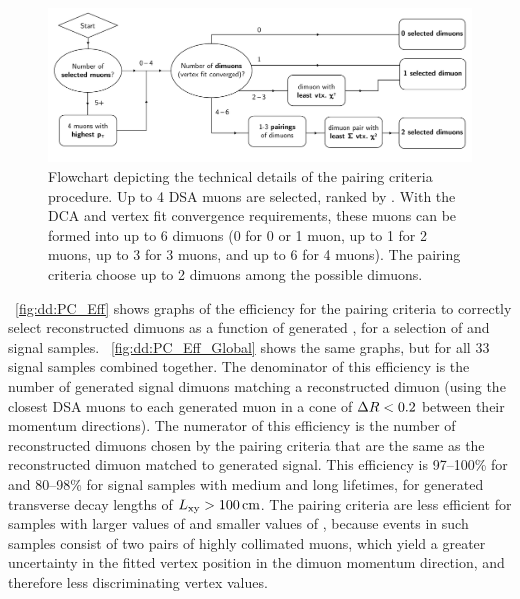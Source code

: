 \begin{figure}[htpb]
  \centering
  \includegraphics[width=\textwidth]{figures/displaced/PairingCriteriaAlgorithm.pdf}
  \caption[Flowchart depicting the technical details of the pairing criteria procedure.]{Flowchart depicting the technical details of the pairing criteria procedure. Up to 4 DSA muons are selected, ranked by \pT. With the DCA and vertex fit convergence requirements, these muons can be formed into up to 6 dimuons (0 for 0 or 1 muon, up to 1 for 2 muons, up to 3 for 3 muons, and up to 6 for 4 muons). The pairing criteria choose up to 2 dimuons among the possible dimuons.}
  \label{fig:dd:pca}
\end{figure}

\Fig~\ref{fig:dd:PC_Eff} shows graphs of the efficiency for the pairing criteria to correctly select reconstructed dimuons as a function of generated \Lxy, for a selection of \twoMu and \fourMu signal samples.
\Fig~\ref{fig:dd:PC_Eff_Global} shows the same graphs, but for all 33 signal samples combined together.
The denominator of this efficiency is the number of generated signal dimuons matching a reconstructed dimuon (using the closest DSA muons to each generated muon in a cone of $\Delta R < 0.2$ between their momentum directions).
The numerator of this efficiency is the number of reconstructed dimuons chosen by the pairing criteria that are the same as the reconstructed dimuon matched to generated signal.
This efficiency is 97--100\% for \twoMu and 80--98\% for \fourMu signal samples with medium and long lifetimes, for generated transverse decay lengths of $L_{\mathrm{xy}} > 100 \,\text{cm}$.
The pairing criteria are less efficient for \fourMu samples with larger values of \mH and smaller values of \mX, because events in such samples consist of two pairs of highly collimated muons, which yield a greater uncertainty in the fitted vertex position in the dimuon momentum direction, and therefore less discriminating vertex \chisq values.

